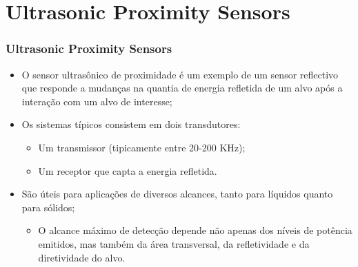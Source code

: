 \documentclass[xcolor=dvipsnames, aspectratio=169]{beamer}
\begin{document}
\section[Ultrasonic Proximity Sensors]{Ultrasonic Proximity Sensors} 
\begin{frame}
\frametitle{Ultrasonic Proximity Sensors}
	\begin{itemize}
		\item O sensor ultrasônico de proximidade é um exemplo de um sensor reflectivo que responde a mudanças na quantia de energia refletida de um alvo após a interação com um alvo de interesse;
		\item Os sistemas típicos consistem em dois transdutores:
		\begin{itemize}
			\item Um transmissor (tipicamente entre 20-200 KHz);
			\item Um receptor que capta a energia refletida.
		\end{itemize}
		\item São úteis para aplicações de diversos alcances, tanto para líquidos quanto para sólidos;
		\begin{itemize}
			\item O alcance máximo de detecção depende não apenas dos níveis de potência emitidos, mas também da área transversal, da refletividade e da diretividade do alvo.
		\end{itemize} 

	\end{itemize}
\end{frame}

\end{document}
